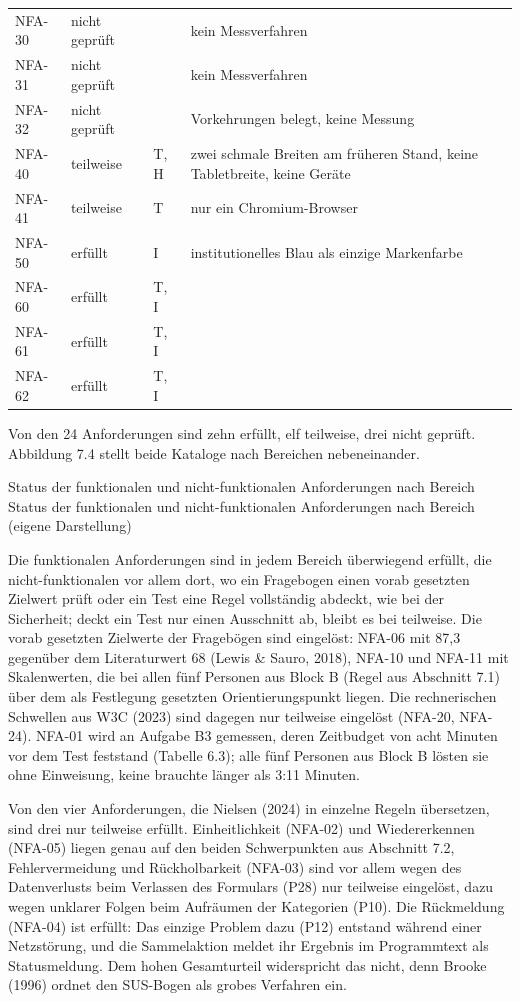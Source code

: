 \begin{longtable}{@{}L{1.6cm}L{2.2cm}L{2.6cm}L{7.2cm}@{}}
	NFA-30 & nicht geprüft & & kein Messverfahren \\
	NFA-31 & nicht geprüft & & kein Messverfahren \\
	NFA-32 & nicht geprüft & & Vorkehrungen belegt, keine Messung \\
	NFA-40 & teilweise & T, H & zwei schmale Breiten am früheren Stand, keine Tabletbreite, keine Geräte \\
	NFA-41 & teilweise & T & nur ein Chromium-Browser \\
	NFA-50 & erfüllt & I & institutionelles Blau als einzige Markenfarbe \\
	NFA-60 & erfüllt & T, I & \\
	NFA-61 & erfüllt & T, I & \\
	NFA-62 & erfüllt & T, I & \\
\end{longtable}
\endgroup

Von den 24 Anforderungen sind zehn erfüllt, elf teilweise, drei nicht geprüft. Abbildung 7.4 stellt beide Kataloge nach Bereichen nebeneinander.

%
{Status der funktionalen und nicht-funktionalen Anforderungen nach Bereich}%
{Status der funktionalen und nicht-funktionalen Anforderungen nach Bereich (eigene Darstellung)}

Die funktionalen Anforderungen sind in jedem Bereich überwiegend erfüllt, die nicht-funktionalen vor allem dort, wo ein Fragebogen einen vorab gesetzten Zielwert prüft oder ein Test eine Regel vollständig abdeckt, wie bei der Sicherheit; deckt ein Test nur einen Ausschnitt ab, bleibt es bei teilweise. Die vorab gesetzten Zielwerte der Fragebögen sind eingelöst: NFA-06 mit 87,3 gegenüber dem Literaturwert 68 (Lewis \& Sauro, 2018), NFA-10 und NFA-11 mit Skalenwerten, die bei allen fünf Personen aus Block B (Regel aus Abschnitt 7.1) über dem als Festlegung gesetzten Orientierungspunkt liegen. Die rechnerischen Schwellen aus W3C (2023) sind dagegen nur teilweise eingelöst (NFA-20, NFA-24). NFA-01 wird an Aufgabe B3 gemessen, deren Zeitbudget von acht Minuten vor dem Test feststand (Tabelle 6.3); alle fünf Personen aus Block B lösten sie ohne Einweisung, keine brauchte länger als 3:11 Minuten.

Von den vier Anforderungen, die Nielsen (2024) in einzelne Regeln übersetzen, sind drei nur teilweise erfüllt. Einheitlichkeit (NFA-02) und Wiedererkennen (NFA-05) liegen genau auf den beiden Schwerpunkten aus Abschnitt 7.2, Fehlervermeidung und Rückholbarkeit (NFA-03) sind vor allem wegen des Datenverlusts beim Verlassen des Formulars (P28) nur teilweise eingelöst, dazu wegen unklarer Folgen beim Aufräumen der Kategorien (P10). Die Rückmeldung (NFA-04) ist erfüllt: Das einzige Problem dazu (P12) entstand während einer Netzstörung, und die Sammelaktion meldet ihr Ergebnis im Programmtext als Statusmeldung. Dem hohen Gesamturteil widerspricht das nicht, denn Brooke (1996) ordnet den SUS-Bogen als grobes Verfahren ein.

